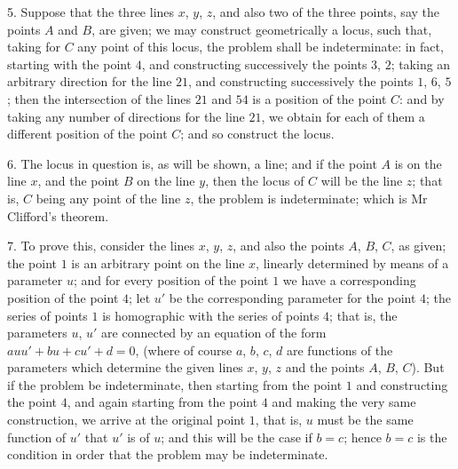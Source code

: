 \documentclass[11pt,a4paper]{article}
\begin{document}
5. Suppose that the three lines $x$, $y$, $z$, and also two of the three points, say
the points $A$ and $B$, are given; we may construct geometrically a locus, such that,
taking for $C$ any point of this locus, the problem shall be indeterminate: in fact,
starting with the point $4$, and constructing successively the points $3$, $2$; taking an
arbitrary direction for the line $21$, and constructing successively the points $1$, $6$, $5$;
then the intersection of the lines $21$ and $54$ is a position of the point $C$: and by
taking any number of directions for the line $21$, we obtain for each of them a different
position of the point $C$; and so construct the locus.

6. The locus in question is, as will be shown, a line; and if the point $A$ is on
the line $x$, and the point $B$ on the line $y$, then the locus of $C$ will be the line $z$;
that is, $C$ being any point of the line $z$, the problem is indeterminate; which is
Mr Clifford's theorem.

7. To prove this, consider the lines $x$, $y$, $z$, and also the points $A$, $B$, $C$, as
given; the point $1$ is an arbitrary point on the line $x$, linearly determined by means
of a parameter $u$; and for every position of the point $1$ we have a corresponding
position of the point $4$; let $u'$ be the corresponding parameter for the point $4$; the
series of points $1$ is homographic with the series of points $4$; that is, the parameters
$u$, $u'$ are connected by an equation of the form $auu' + bu + cu' + d = 0$, (where of course
$a$, $b$, $c$, $d$ are functions of the parameters which determine the given lines $x$, $y$, $z$ and
the points $A$, $B$, $C$). But if the problem be indeterminate, then starting from the point
$1$ and constructing the point $4$, and again starting from the point $4$ and making the
very same construction, we arrive at the original point $1$, that is, $u$ must be the
same function of $u'$ that $u'$ is of $u$; and this will be the case if $b=c$; hence $b=c$
is the condition in order that the problem may be indeterminate.
\end{document}
